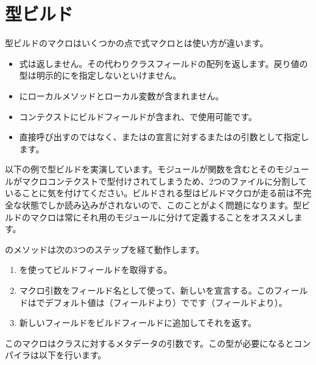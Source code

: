 \section{型ビルド}
\label{macro-type-building}

型ビルドのマクロはいくつかの点で式マクロとは使い方が違います。

\begin{itemize}
	\item 式は返しません。その代わりクラスフィールドの配列を返します。戻り値の型は明示的にを指定しないといけません。
	\item {}にローカルメソッドとローカル変数が含まれません。
	\item コンテクストにビルドフィールドが含まれ、で使用可能です。
	\item 直接呼び出すのではなく、またはの宣言に対するまたはの引数として指定します。
\end{itemize}

以下の例で型ビルドを実演しています。モジュールが関数を含むとそのモジュールがマクロコンテクストで型付けされてしまうため、2つのファイルに分割していることに気を付けてください。ビルドされる型はビルドマクロが走る前は不完全な状態でしか読み込みがされないので、このことがよく問題になります。型ビルドのマクロは常にそれ用のモジュールに分けて定義することをオススメします。


のメソッドは次の3つのステップを経て動作します。

\begin{enumerate}
	\item {}を使ってビルドフィールドを取得する。
	\item {}マクロ引数をフィールド名として使って、新しいを宣言する。このフィールドはでデフォルト値は（フィールドより）でです（フィールドより）。
	\item 新しいフィールドをビルドフィールドに追加してそれを返す。
\end{enumerate}

このマクロはクラスに対するメタデータの引数です。この型が必要になるとコンパイラは以下を行います。

